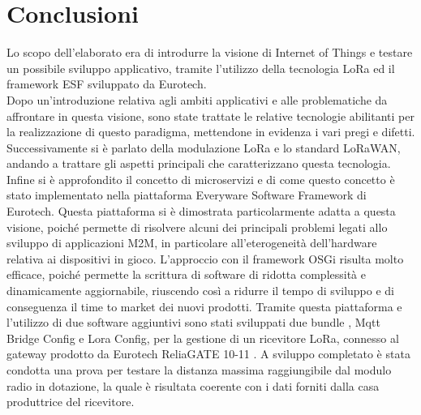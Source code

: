\chapter{Conclusioni}
Lo scopo dell’elaborato era di introdurre la visione di Internet of Things e
testare un possibile sviluppo applicativo, tramite l'utilizzo della tecnologia  
LoRa ed il framework ESF sviluppato da Eurotech.\\
Dopo un'introduzione relativa agli ambiti applicativi e alle problematiche da
affrontare in questa visione, sono state trattate le relative tecnologie
abilitanti per la realizzazione di  questo paradigma, mettendone in evidenza i
vari pregi e difetti. 
Successivamente si è parlato della modulazione LoRa e lo standard LoRaWAN,
andando a trattare gli aspetti principali che caratterizzano questa
tecnologia.
Infine si è approfondito il concetto di microservizi e di come questo concetto
è stato implementato nella piattaforma Everyware Software Framework di Eurotech.
Questa piattaforma si è dimostrata
particolarmente adatta a questa visione, poiché permette di risolvere alcuni
dei principali problemi legati allo sviluppo di applicazioni M2M, in particolare all’eterogeneità
dell’hardware relativa ai dispositivi in gioco. 
L’approccio con il framework OSGi risulta molto efficace, poiché permette la
scrittura di  software di  ridotta complessità e dinamicamente aggiornabile, 
riuscendo così a ridurre il tempo di sviluppo e di conseguenza il time to market
dei nuovi prodotti.
Tramite questa piattaforma e l'utilizzo di due software aggiuntivi 
sono stati sviluppati due bundle , Mqtt Bridge Config e Lora Config,
per la gestione di un ricevitore LoRa, connesso al gateway prodotto da Eurotech ReliaGATE 10-11 
. A sviluppo completato è stata condotta una prova per testare la
distanza massima raggiungibile dal modulo radio in dotazione, la quale è
risultata coerente con i dati forniti dalla casa produttrice del ricevitore.
